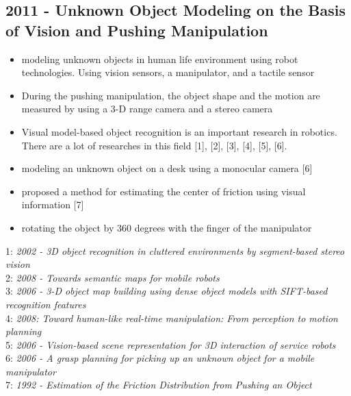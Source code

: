 \subsection{2011 - Unknown Object Modeling on the Basis of Vision and Pushing Manipulation}
\begin{itemize}
\item modeling unknown objects in human life environment using robot technologies. Using vision sensors, a manipulator, and a tactile sensor
\item During the pushing manipulation, the object shape and the motion are measured by using a 3-D range camera and a stereo camera
\item Visual model-based object recognition is an important research in robotics. There are a lot of researches in this field [1], [2], [3], [4], [5], [6].
\item modeling an unknown object on a desk using
a monocular camera [6]
\item proposed a method for estimating the center of friction using visual information [7]
\item  rotating the
object by 360 degrees with the finger of the manipulator
\end{itemize}
1: \textit{2002 -  3D object recognition in cluttered
environments by segment-based stereo vision} \\
2: \textit{2008 - Towards semantic maps for mobile robots} \\
3: \textit{2006 - 3-D object map building using dense object models with SIFT-based recognition features} \\
4: \textit{2008: Toward human-like real-time manipulation: From perception to motion planning} \\
5: \textit{2006 - Vision-based scene representation for 3D interaction of service robots} \\
6: \textit{2006 - A grasp planning for picking
up an unknown object for a mobile manipulator} \\
7: \textit{1992 - Estimation of the Friction Distribution
from Pushing an Object}

